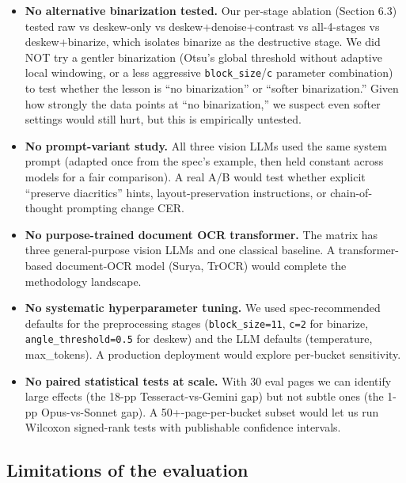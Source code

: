 \documentclass[
  letterpaper,
  DIV=11,
  numbers=noendperiod]{scrartcl}
\providecommand{\tightlist}{%
  \setlength{\itemsep}{0pt}\setlength{\parskip}{0pt}}
\begin{document}
\begin{itemize}
\tightlist
\item
  \textbf{No alternative binarization tested.} Our per-stage ablation
  (Section 6.3) tested raw vs deskew-only vs deskew+denoise+contrast vs
  all-4-stages vs deskew+binarize, which isolates binarize as the
  destructive stage. We did NOT try a gentler binarization (Otsu's
  global threshold without adaptive local windowing, or a less
  aggressive \texttt{block\_size}/\texttt{c} parameter combination) to
  test whether the lesson is ``no binarization'' or ``softer
  binarization.'' Given how strongly the data points at ``no
  binarization,'' we suspect even softer settings would still hurt, but
  this is empirically untested.
\item
  \textbf{No prompt-variant study.} All three vision LLMs used the same
  system prompt (adapted once from the spec's example, then held
  constant across models for a fair comparison). A real A/B would test
  whether explicit ``preserve diacritics'' hints, layout-preservation
  instructions, or chain-of-thought prompting change CER.
\item
  \textbf{No purpose-trained document OCR transformer.} The matrix has
  three general-purpose vision LLMs and one classical baseline. A
  transformer-based document-OCR model (Surya, TrOCR) would complete the
  methodology landscape.
\item
  \textbf{No systematic hyperparameter tuning.} We used spec-recommended
  defaults for the preprocessing stages (\texttt{block\_size=11},
  \texttt{c=2} for binarize, \texttt{angle\_threshold=0.5} for deskew)
  and the LLM defaults (temperature, max\_tokens). A production
  deployment would explore per-bucket sensitivity.
\item
  \textbf{No paired statistical tests at scale.} With 30 eval pages we
  can identify large effects (the 18-pp Tesseract-vs-Gemini gap) but not
  subtle ones (the 1-pp Opus-vs-Sonnet gap). A 50+-page-per-bucket
  subset would let us run Wilcoxon signed-rank tests with publishable
  confidence intervals.
\end{itemize}

\subsection{Limitations of the
evaluation}\label{limitations-of-the-evaluation}
\end{document}
